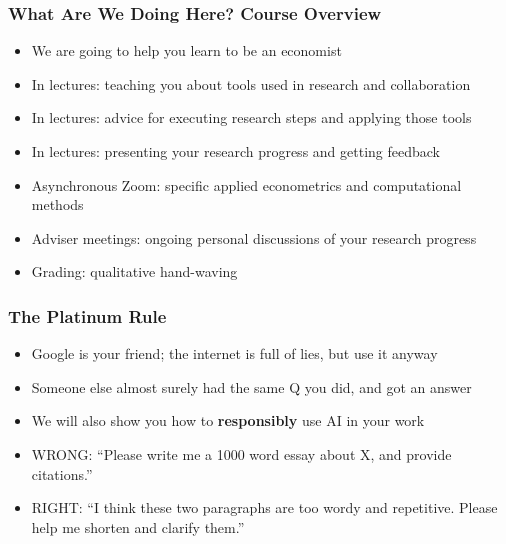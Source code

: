 \documentclass[aspectratio=169]{beamer}
\begin{document}

\begin{frame}
\frametitle{What Are We Doing Here? Course Overview}
\begin{itemize}
	\item We are going to help you learn to be an economist
	
	\item In lectures: teaching you about tools used in research and collaboration
	
	\item In lectures: advice for executing research steps and applying those tools
	
	\item <2->In lectures: presenting your research progress and getting feedback
	
	\item <3->Asynchronous Zoom: specific applied econometrics and computational methods
	
	\item <4->Adviser meetings: ongoing personal discussions of your research progress
	
	\item <5->Grading: qualitative hand-waving
\end{itemize}
\end{frame}

\begin{frame}
\frametitle{The Platinum Rule}
\begin{itemize}
	\item Google is your friend; the internet is full of lies, but use it anyway
	
	\item Someone else almost surely had the same Q you did, and got an answer
	
	\item <2->We will also show you how to \textbf{responsibly} use AI in your work
	
	\item <3->WRONG: ``Please write me a 1000 word essay about X, and provide citations.''
	
	\item <3->RIGHT: ``I think these two paragraphs are too wordy and repetitive. Please help me shorten and clarify them.''
\end{itemize}
\end{frame}

\end{document}
